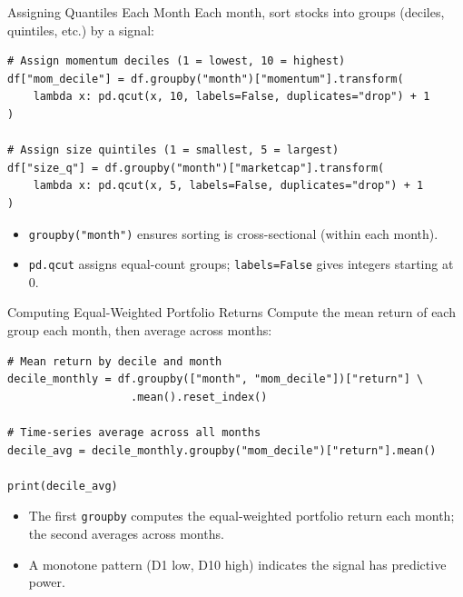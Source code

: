 \documentclass[aspectratio=169,t]{beamer}
\begin{document}
\begin{frame}[fragile]{Assigning Quantiles Each Month}
Each month, sort stocks into groups (deciles, quintiles, etc.) by a signal:

\vspace{0.3cm}
\begin{shadedbox}
\small
\begin{verbatim}
# Assign momentum deciles (1 = lowest, 10 = highest)
df["mom_decile"] = df.groupby("month")["momentum"].transform(
    lambda x: pd.qcut(x, 10, labels=False, duplicates="drop") + 1
)

# Assign size quintiles (1 = smallest, 5 = largest)
df["size_q"] = df.groupby("month")["marketcap"].transform(
    lambda x: pd.qcut(x, 5, labels=False, duplicates="drop") + 1
)
\end{verbatim}
\end{shadedbox}

\begin{itemize}
\item \texttt{groupby("month")} ensures sorting is cross-sectional (within each month).
\item \texttt{pd.qcut} assigns equal-count groups; \texttt{labels=False} gives integers starting at 0.
\end{itemize}
\end{frame}

\begin{frame}[fragile]{Computing Equal-Weighted Portfolio Returns}
Compute the mean return of each group each month, then average across months:

\begin{shadedbox}
\small
\begin{verbatim}
# Mean return by decile and month
decile_monthly = df.groupby(["month", "mom_decile"])["return"] \
                   .mean().reset_index()

# Time-series average across all months
decile_avg = decile_monthly.groupby("mom_decile")["return"].mean()

print(decile_avg)
\end{verbatim}
\end{shadedbox}

\begin{itemize}
\item The first \texttt{groupby} computes the equal-weighted portfolio return each month; the second averages across months.
\item A monotone pattern (D1 low, D10 high) indicates the signal has predictive power.
\end{itemize}
\end{frame}
\end{document}
